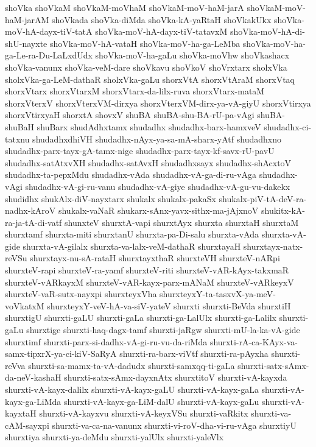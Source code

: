 {shoVka
shoVkaM
shoVkaM-moVhaM
shoVkaM-moV-haM-jarA
shoVkaM-moV-haM-jarAM
shoVkada
shoVka-diMda
shoVka-kA-yaRtaH
shoVkakUkx
shoVka-moV-hA-dayx-tiV-tatA
shoVka-moV-hA-dayx-tiV-tatavxM
shoVka-moV-hA-di-shU-nayxte
shoVka-moV-hA-vataH
shoVka-moV-ha-ga-LeMba
shoVka-moV-ha-ga-Le-ra-Du-LaLxdUdx
shoVka-moV-ha-gaLu
shoVka-moVhw
shoVkashacx
shoVka-vanunx
shoVka-veM-dare
shoVkavu
shoVkoV
shoVrxtarx
sholxVka
sholxVka-ga-LeM-dathaR
sholxVka-gaLu
shorxVtA
shorxVtAraM
shorxVtaq
shorxVtarx
shorxVtarxM
shorxVtarx-da-lilx-ruva
shorxVtarx-mataM
shorxVterxV
shorxVterxVM-dirxya
shorxVterxVM-dirx-ya-vA-giyU
shorxVtirxya
shorxVtirxyaH
shorxtA
shovxV
shuBA
shuBA-shu-BA-rU-pa-vAgi
shuBA-shuBaH
shuBarx
shudAdhxtamx
shudadhx
shudadhx-barx-hamxveV
shudadhx-ci-tatxnu
shudadhxdhiVH
shudadhx-nAyx-ya-sa-mA-sharx-yAtf
shudadhxno
shudadhx-parx-tayx-gA-tamx-nige
shudadhx-parx-tayx-kf-savx-rU-pavU
shudadhx-satAtxvXH
shudadhx-satAvxH
shudadhxsayx
shudadhx-shAcxtoV
shudadhx-ta-pepxMdu
shudadhx-vAda
shudadhx-vA-ga-di-ru-vAga
shudadhx-vAgi
shudadhx-vA-gi-ru-vanu
shudadhx-vA-giye
shudadhx-vA-gu-vu-dakekx
shudidhx
shukAlx-diV-nayxtarx
shukalx
shukalx-pakaSx
shukalx-piV-tA-deV-ra-nadhx-kAroV
shukalx-vaNaR
shukarx-sAnx-yavx-sithx-ma-jAjxnoV
shukitx-kA-ra-ja-tA-di-vatf
shunxteV
shurxtA-vapi
shurxtAyx
shurxta
shurxtaH
shurxtaM
shurxtamf
shurxta-miti
shurxtanU
shurxta-pa-Di-salu
shurxta-vAda
shurxta-vA-gide
shurxta-vA-gilalx
shurxta-va-lalx-veM-dathaR
shurxtayaH
shurxtayx-natx-reVSu
shurxtayx-nu-sA-rataH
shurxtayxthaR
shurxteVH
shurxteV-nARpi
shurxteV-rapi
shurxteV-ra-yamf
shurxteV-riti
shurxteV-vAR-kAyx-takxmaR
shurxteV-vARkayxM
shurxteV-vAR-kayx-parx-mANaM
shurxteV-vARkeyxV
shurxteV-vaR-sutx-nayxpi
shurxteyxVha
shurxteyxY-ta-tasxvX-ya-meV-voVkatxM
shurxteyxY-veV-hA-va-siV-yateV
shurxti
shurxti-BeVda
shurxtiH
shurxtigU
shurxti-gaLU
shurxti-gaLa
shurxti-ga-LalUlx
shurxti-ga-Lalilx
shurxti-gaLu
shurxtige
shurxti-haq-dagx-tamf
shurxti-jaRgw
shurxti-mU-la-ka-vA-gide
shurxtimf
shurxti-parx-si-dadhx-vA-gi-ru-vu-da-riMda
shurxti-rA-ca-KAyx-va-samx-tipxrX-ya-ci-kiV-SaRyA
shurxti-ra-barx-viVtf
shurxti-ra-pAyxha
shurxti-reVva
shurxti-sa-mamx-ta-vA-dadudx
shurxti-samxqq-ti-gaLa
shurxti-satx-sAmx-da-neV-kashaH
shurxti-satx-sAmx-dayxnAtx
shurxtitoV
shurxti-vA-kayxda
shurxti-vA-kayx-dalilx
shurxti-vA-kayx-gaLU
shurxti-vA-kayx-gaLa
shurxti-vA-kayx-ga-LiMda
shurxti-vA-kayx-ga-LiM-dalU
shurxti-vA-kayx-gaLu
shurxti-vA-kayxtaH
shurxti-vA-kayxvu
shurxti-vA-keyxVSu
shurxti-vaRkitx
shurxti-va-cAM-sayxpi
shurxti-va-ca-na-vanunx
shurxti-vi-roV-dha-vi-ru-vAga
shurxtiyU
shurxtiya
shurxti-ya-deMdu
shurxti-yalUlx
shurxti-yaleVlx
}
